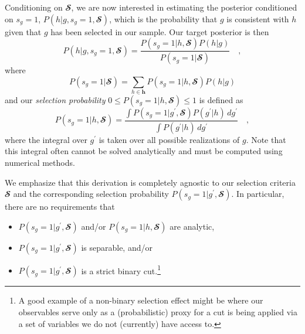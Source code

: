 \documentclass[a4paper,fleqn,usenatbib,english]{mnras}
\begin{document}
Conditioning on $\mathbfcal{S}$, we are now interested in estimating the posterior conditioned on $s_g=1$, $P(h|g,s_g=1,\mathbfcal{S})$, which is the probability that $g$ is consistent with $h$ given that $g$ has been selected in our sample. Our target posterior is then
\begin{equation}
\boxed{
P(h|g,s_g=1,\mathbfcal{S}) = \frac{P(s_g=1|h,\mathbfcal{S}) P(h|g)}{P(s_g=1|\mathbfcal{S})}
} \quad ,
\end{equation}
where 
\begin{equation}
P(s_g=1|\mathbfcal{S}) = \sum_{h \in \mathbf{h}} P(s_g=1|h,\mathbfcal{S}) P(h|g)
\end{equation}
and our \textit{selection probability} $0 \leq P(s_g=1|h,\mathbfcal{S}) \leq 1$ is defined as
\begin{equation}\label{eq:sel_g_h}
P(s_g=1|h,\mathbfcal{S}) = \frac{\int P(s_g=1|g^\prime,\mathbfcal{S}) P(g^\prime|h) \, dg^\prime}{\int P(g^\prime|h) \, dg^\prime} \quad ,
\end{equation}
where the integral over $g^\prime$ is taken over all possible realizations of $g$. Note that this integral often cannot be solved analytically and must be computed using numerical methods.


We emphasize that this derivation is completely agnostic to our selection criteria $\mathbfcal{S}$ and the corresponding selection probability $P(s_g=1|g^\prime,\mathbfcal{S})$. In particular, there are no requirements that
\begin{itemize}
	\item $P(s_g=1|g^\prime,\mathbfcal{S})$ and/or $P(s_g=1|h,\mathbfcal{S})$ are analytic,
    \item $P(s_g=1|g^\prime,\mathbfcal{S})$ is separable, and/or
    \item $P(s_g=1|g^\prime,\mathbfcal{S})$ is a strict binary cut.\footnote{A good example of a non-binary selection effect might be where our observables serve only as a (probabilistic) proxy for a cut is being applied via a set of variables we do not (currently) have access to.}
\end{itemize}
\end{document}

